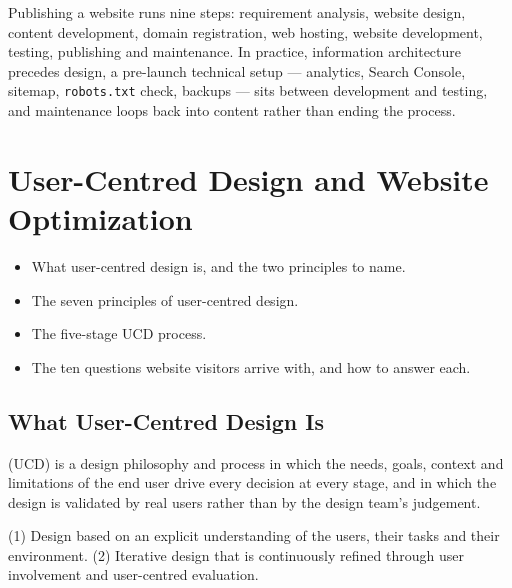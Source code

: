 \documentclass{MMTextbook}
\begin{document}
\begin{summarybox}
Publishing a website runs nine steps: requirement analysis, website design,
content development, domain registration, web hosting, website development,
testing, publishing and maintenance. In practice, information architecture
precedes design, a pre-launch technical setup --- analytics, Search Console,
sitemap, \texttt{robots.txt} check, backups --- sits between development and
testing, and maintenance loops back into content rather than ending the process.
\end{summarybox}

\chapter{User-Centred Design and Website Optimization}


\begin{learningoutcomes}
\begin{itemize}
\item What user-centred design is, and the two principles to name.
\item The seven principles of user-centred design.
\item The five-stage UCD process.
\item The ten questions website visitors arrive with, and how to answer each.
\end{itemize}
\end{learningoutcomes}

\section{What User-Centred Design Is}

\begin{definitionbox}
 (UCD) is a design philosophy
and process in which the needs, goals, context and limitations of the end user
drive every decision at every stage, and in which the design is validated by real
users rather than by the design team's judgement.
\end{definitionbox}

\begin{exambox}
(1) Design based on an explicit understanding of the users, their tasks and their
environment. (2) Iterative design that is continuously refined through user
involvement and user-centred evaluation.
\end{exambox}
\end{document}
